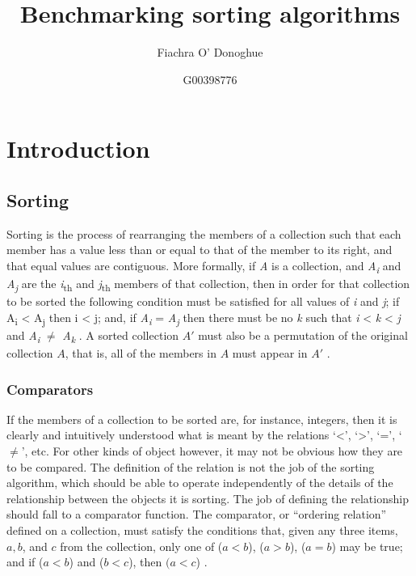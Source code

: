 \documentclass[12pt, a4paper]{article}
\title{Benchmarking sorting algorithms}
\author{Fiachra O' Donoghue}
\date{%
    G00398776\\%
}
\begin{document}
\maketitle

\section{Introduction}

\subsection{Sorting}

Sorting is the process of rearranging the members of a collection such that each member has a value less than or equal to that of the member to its right, and that equal values are contiguous. More formally, if \emph{A} is a collection, and \emph{A\textsubscript{i}} and \emph{A\textsubscript{j}} are the \emph{i}\textsubscript{th}  and \emph{j}\textsubscript{th} members of that collection, then in order for that collection to be sorted the following condition must be satisfied for all values of \emph{i} and \emph{j}; if A\textsubscript{i} < A\textsubscript{j} then i < j; and, if \emph{A\textsubscript{i}} = \emph{A\textsubscript{j}} then there must be no \emph{k} such that \emph{i} < \emph{k} < \emph{j} and \emph{A\textsubscript{i}} $\ne$ \emph{A\textsubscript{k}} \autocite[53]{heineman2016algorithms}. A sorted collection $A'$ must also be a permutation of the original collection $A$, that is, all of the members in $A$ must appear in $A'$ \autocite[15]{cormen01}.

\subsubsection{Comparators}

If the members of a collection to be sorted are, for instance, integers, then it is clearly and intuitively understood what is meant by the relations `<', `>', `=', `$\ne$', etc. For other kinds of object however, it may not be obvious how they are to be compared. The definition of the relation is not the job of the sorting algorithm, which should be able to operate independently of the details of the relationship between the objects it is sorting. The job of defining the relationship should fall to a comparator function. The comparator, or ``ordering relation'' defined on a collection, must satisfy the conditions that, given any three items, $a, b$, and $c$ from the collection, only one of ($a < b$), ($a > b$), ($a = b$) may be true; and if ($a < b$) and ($b < c$), then $(a < c$) \autocite[5]{knuth1968art}.
\end{document}
